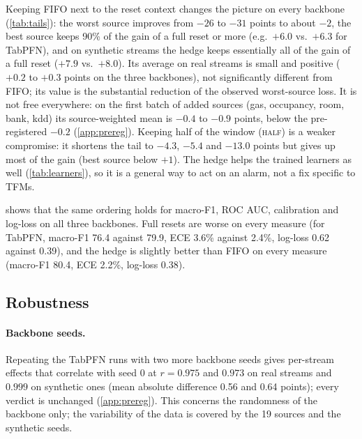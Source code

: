 \documentclass[10pt]{article}
\theoremstyle{definition}
\theoremstyle{remark}
\newcommand{\half}{\textup{\textsc{half}}}
\begin{document}
Keeping FIFO next to the reset context changes the picture on every backbone (\cref{tab:tails}): the worst source
improves from $-26$ to $-31$ points to about $-2$, the best source keeps 90\% of the gain of a full reset or more
(e.g.\ $+6.0$ vs.\ $+6.3$ for TabPFN), and on synthetic streams the hedge keeps essentially all of the gain of a full
reset ($+7.9$ vs.\ $+8.0$). Its average on real streams is small and positive ($+0.2$ to $+0.3$ points on the three backbones), not
significantly different from FIFO; its value is the substantial reduction of the observed worst-source loss. It is
not free everywhere: on the first batch of added sources (gas, occupancy, room, bank, kdd) its source-weighted mean is
$-0.4$ to $-0.9$ points, below the pre-registered $-0.2$ (\cref{app:prereg}). Keeping half of the window (\half) is a weaker
compromise: it shortens the tail to $-4.3$, $-5.4$ and $-13.0$ points but gives up most of the gain (best source
below $+1$). The hedge helps the
trained learners as well (\cref{tab:learners}), so it is a general way to act on an alarm, not a fix specific to TFMs.



 shows that the same ordering holds for macro-F1, ROC AUC, calibration and log-loss on all three
backbones. Full resets are worse on every measure (for TabPFN, macro-F1 76.4 against 79.9, ECE 3.6\% against 2.4\%,
log-loss 0.62 against 0.39), and the hedge is slightly better than FIFO on every measure (macro-F1 80.4, ECE 2.2\%,
log-loss 0.38).

\subsection{Robustness}
\label{sec:robust}

\paragraph{Backbone seeds.} Repeating the TabPFN runs with two more backbone seeds gives per-stream effects that
correlate with seed 0 at $r=0.975$ and $0.973$ on real streams and $0.999$ on synthetic ones (mean absolute
difference 0.56 and 0.64 points); every verdict is unchanged (\cref{app:prereg}). This concerns the randomness of the
backbone only; the variability of the data is covered by the 19 sources and the synthetic seeds.
\end{document}
